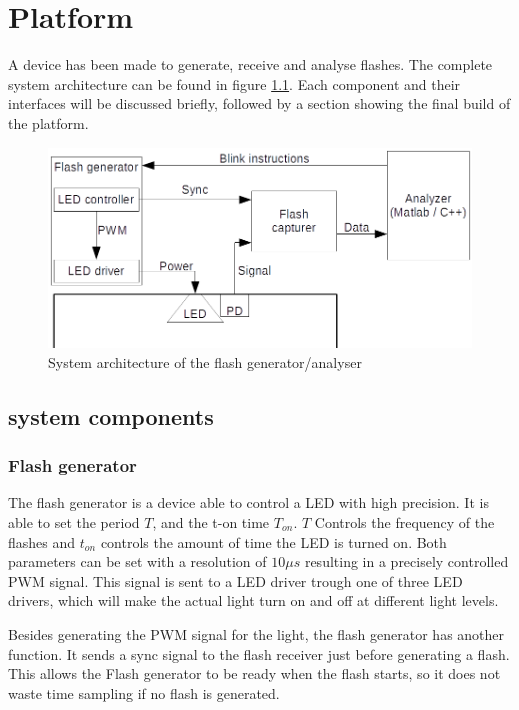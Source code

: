 \chapter{Platform}
\label{chp:Platform}
A device has been made to generate, receive and analyse flashes. The complete system architecture can be found in figure \ref{fig:systemOveriew}. Each component and their interfaces will be discussed briefly, followed by a section showing the final build of the platform.

\begin{figure}[h]
	\includegraphics[width=\textwidth]{pics/systemOverview.png}
	\caption{System architecture of the flash generator/analyser}
	\label{fig:systemOveriew}
\end{figure}

\section{system components}

\subsection{Flash generator}
The flash generator is a device able to control a LED with high precision. It is able to set the period $T$, and the t-on time $T_{on}$. $T$ Controls the frequency of the flashes and $t_{on}$ controls the amount of time the LED is turned on. Both parameters can be set with a resolution of $10\mu s$ resulting in a precisely controlled PWM signal. This signal is sent to a LED driver trough one of three LED drivers, which will make the actual light turn on and off at different light levels.

Besides generating the PWM signal for the light, the flash generator has another function. It sends a sync signal to the flash receiver just before generating a flash. This allows the Flash generator to be ready when the flash starts, so it does not waste time sampling if no flash is generated.

